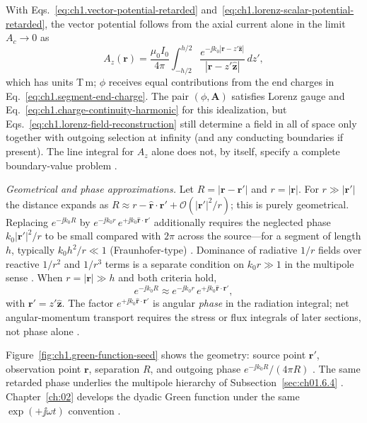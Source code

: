 \begin{example}
With Eqs.~\eqref{eq:ch1.vector-potential-retarded} and~\eqref{eq:ch1.lorenz-scalar-potential-retarded}, the vector potential follows from the axial current alone in the limit $A_c\to 0$ as
\begin{equation}
\label{eq:ch1.line-segment-potential}
A_z(\mathbf{r})=\frac{\mu_0 I_0}{4\pi}\int_{-h/2}^{h/2}
\frac{e^{-\jj k_0|\mathbf{r}-z'\hat{\mathbf{z}}|}}{|\mathbf{r}-z'\hat{\mathbf{z}}|}\,dz',
\end{equation}
which has units T\,m; $\phi$ receives equal contributions from the end charges in Eq.~\eqref{eq:ch1.segment-end-charge}. The pair $(\phi,\mathbf{A})$ satisfies Lorenz gauge and Eq.~\eqref{eq:ch1.charge-continuity-harmonic} for this idealization, but Eqs.~\eqref{eq:ch1.lorenz-field-reconstruction} still determine a field in all of space only together with outgoing selection at infinity (and any conducting boundaries if present). The line integral for $A_z$ alone does not, by itself, specify a complete boundary-value problem \cite{stratton1941}.

\emph{Geometrical and phase approximations.} Let $R=|\mathbf{r}-\mathbf{r}'|$ and $r=|\mathbf{r}|$. For $r\gg|\mathbf{r}'|$ the distance expands as $R\approx r-\hat{\mathbf{r}}\cdot\mathbf{r}'+\mathcal{O}(|\mathbf{r}'|^2/r)$; this is purely geometrical. Replacing $e^{-\jj k_0 R}$ by $e^{-\jj k_0 r}\,e^{+\jj k_0\hat{\mathbf{r}}\cdot\mathbf{r}'}$ additionally requires the neglected phase $k_0|\mathbf{r}'|^2/r$ to be small compared with $2\pi$ across the source---for a segment of length $h$, typically $k_0 h^2/r\ll 1$ (Fraunhofer-type) \cite{stratton1941,jackson1999}. Dominance of radiative $1/r$ fields over reactive $1/r^2$ and $1/r^3$ terms is a separate condition on $k_0 r\gg 1$ in the multipole sense \cite{stratton1941}. When $r=|\mathbf{r}|\gg h$ and both criteria hold,
\begin{equation}
\label{eq:ch1.green-far-zone-phase}
e^{-\jj k_0 R}\approx e^{-\jj k_0 r}\,e^{+\jj k_0\hat{\mathbf{r}}\cdot\mathbf{r}'},
\end{equation}
with $\mathbf{r}'=z'\hat{\mathbf{z}}$. The factor $e^{+\jj k_0\hat{\mathbf{r}}\cdot\mathbf{r}'}$ is angular \emph{phase} in the radiation integral; net angular-momentum transport requires the stress or flux integrals of later sections, not phase alone \cite{stratton1941,jackson1999}.
\end{example}

Figure~\ref{fig:ch1.green-function-seed} shows the geometry: source point $\mathbf{r}'$, observation point $\mathbf{r}$, separation $R$, and outgoing phase $e^{-\jj k_0 R}/(4\pi R)$ \cite{stratton1941,jackson1999,tai1994}. The same retarded phase underlies the multipole hierarchy of Subsection~\ref{sec:ch01.6.4} \cite{jackson1999,stratton1941}. Chapter~\ref{ch:02} develops the dyadic Green function under the same $\exp(+\jj\omega t)$ convention \cite{harrington2001,tai1994,stratton1941}.

